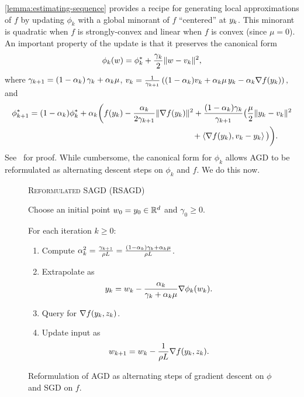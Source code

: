 \autoref{lemma:estimating-sequence} provides a recipe for generating local approximations of \( f \) by updating \( \phi_k \) with a global minorant of \( f \) ``centered'' at \( y_k \). 
This minorant is quadratic when \( f \) is strongly-convex and linear when \( f \) is convex (since \( \mu = 0 \)).
An important property of the update is that it preserves the canonical form
\begin{align}
    \phi_k(w) = \phi_k^* + \frac{\gamma_k}{2}\|w - v_k\|^2,\label{eq:canonical-form}
\end{align}
where \( \gamma_{k+1} = \left(1 - \alpha_{k}\right)\gamma_k + \alpha_{k} \mu \), \( v_k = \frac{1}{\gamma_{k+1}} \left((1-\alpha_{k})v_k + \alpha_{k} \mu \, y_k - \alpha_{k} \nabla f(y_k)\right), \) and 
\begin{align*}
    \phi^*_{k+1} &= (1 - \alphak) \phi^*_k + \alphak\bigg(f(\yk) - \frac{\alphak}{2 \gamma_{k+1}} \norm{\grad(\yk)}^2 + \frac{(1 - \alphak)\gamma_k}{\gamma_{k+1}} \big(\frac{\mu}{2}\norm{\yk - \vk}^2\\ 
    & \hspace{20em} + \abr{\grad(\yk), \vk - \yk} \big) \bigg). 
\end{align*}
See~\citet[Lemma 2.2.3]{nesterov2004lectures} for proof.
While cumbersome, the canonical form for \( \phi_k \) allows \ac{AGD} to be reformulated as alternating descent steps on \( \phi_k \) and \( f \).
We do this now.

\begin{figure}[t]
    \centering
    \begin{procedure}{\textsc{Reformulated} \ac{SAGD} (\acs{RSAGD})}
        \item Choose an initial point \( w_0 = y_0 \in \mathbb{R}^d \) and \( \gamma_0 \geq 0 \).
        \item For each iteration \( k \geq 0 \):
            \begin{enumerate}
                \item Compute 
                    \( \alpha^2_k = \frac{\gamma_{k+1}}{\rho L } = \frac{(1-\alpha_k)\gamma_k + \alpha_k \mu}{\rho L} \).
                \item Extrapolate as
                    \[ y_k = w_k - \frac{\alpha_k}{\gamma_k + \alpha_k \mu} \nabla \phi_k(w_k). \]

                \item Query \oracle{} for \( \nabla f(y_k, z_{k}) \). 
                \item Update input as\vspace{-1ex}%
                    \[ w_{k+1} = w_k - \frac{1}{\rho L} \nabla f(y_k, z_{k}). \]
            \end{enumerate}
    \end{procedure}
    \caption[Reformulation of Nesterov's accelerated gradient descent as an alternating descent procedure.]%
        {Reformulation of \ac{AGD} as alternating steps of gradient descent on \( \phi \) and \ac{SGD} on \( f \).}%
    \label{procedure:reformulated-agd}
\end{figure}

